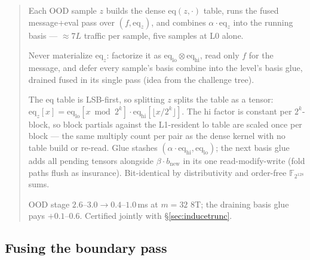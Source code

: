 \documentclass[11pt]{article}
\newenvironment{optsummary}{%
  \begin{quote}\small
  \begin{description}
  \setlength{\itemsep}{1pt}\setlength{\parsep}{0pt}\setlength{\topsep}{2pt}
}{%
  \end{description}
  \end{quote}
}
\begin{document}
\begin{optsummary}
\item[Baseline:] Each OOD sample $z$ builds the dense $\mathrm{eq}(z,\cdot)$ table, runs the fused message+eval pass over $(f, \mathrm{eq}_z)$, and combines $\alpha\cdot\mathrm{eq}_z$ into the running basis --- $\approx7L$ traffic per sample, five samples at L0 alone.
\item[Improvement:] Never materialize $\mathrm{eq}_z$: factorize it as $\mathrm{eq}_{\mathrm{lo}}\otimes\mathrm{eq}_{\mathrm{hi}}$, read only $f$ for the message, and defer every sample's basis combine into the level's basis glue, drained fused in its single pass (idea from the challenge tree).
\item[Mechanism:] The eq table is LSB-first, so splitting $z$ splits the table as a tensor: $\mathrm{eq}_z[x] = \mathrm{eq}_{\mathrm{lo}}[x \bmod 2^k]\cdot\mathrm{eq}_{\mathrm{hi}}[\lfloor x/2^k\rfloor]$. The hi factor is constant per $2^k$-block, so block partials against the L1-resident lo table are scaled once per block --- the same multiply count per pair as the dense kernel with no table build or re-read. Glue stashes $(\alpha\cdot\mathrm{eq}_{\mathrm{hi}}, \mathrm{eq}_{\mathrm{lo}})$; the next basis glue adds all pending tensors alongside $\beta\cdot b_{\mathrm{new}}$ in its one read-modify-write (fold paths flush as insurance). Bit-identical by distributivity and order-free $\mathbb{F}_{2^{128}}$ sums.
\item[Result:] OOD stage $2.6$--$3.0\to0.4$--$1.0\,$ms at $m{=}32$ 8T; the draining basis glue pays $+0.1$--$0.6$. Certified jointly with \S\ref{sec:inducetrunc}.
\end{optsummary}

\subsection{Fusing the boundary pass}
\label{sec:boundaryjoin}
\end{document}
